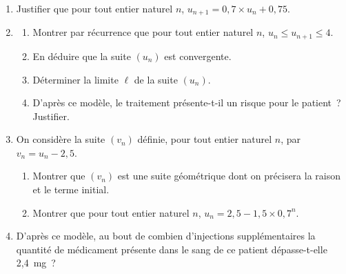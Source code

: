 \begin{enumerate}
\item Justifier que pour tout entier naturel $n$, $u_{n+1} = 0,7 \times u_n + 0,75$.
\item
\begin{enumerate}[label=\textbf{\alph*.}]
\item Montrer par récurrence que pour tout entier naturel $n$, $u_n \leqslant u_{n+1} \leqslant 4$.
\item En déduire que la suite $(u_n)$ est convergente.
\item Déterminer la limite $\ell$ de la suite $(u_n)$.
\item D'après ce modèle, le traitement présente-t-il un risque pour le patient~? Justifier.
\end{enumerate}
\item On considère la suite $(v_n)$ définie, pour tout entier naturel $n$, par $v_n = u_n - 2,5$.
\begin{enumerate}[label=\textbf{\alph*.}]
\item Montrer que $(v_n)$ est une suite géométrique dont on précisera la raison et le terme initial.
\item Montrer que pour tout entier naturel $n$, $u_n = 2,5 - 1,5 \times 0,7^n$.
\end{enumerate}
\item D'après ce modèle, au bout de combien d'injections supplémentaires la quantité de médicament présente dans le sang de ce patient dépasse-t-elle 2,4~mg~?
\end{enumerate}
